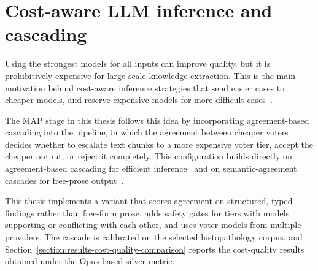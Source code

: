 \section{Cost-aware LLM inference and cascading}\label{section:background-cost-aware-llm-inference-and-cascading}

Using the strongest models for all inputs can improve quality, but it is prohibitively expensive for large-scale knowledge extraction. This is the main motivation behind cost-aware inference strategies that send easier cases to cheaper models, and reserve expensive models for more difficult cases~\parencite{chen2023frugalgpt}. 

The MAP stage in this thesis follows this idea by incorporating agreement-based cascading into the pipeline, in which the agreement between cheaper voters decides whether to escalate text chunks to a more expensive voter tier, accept the cheaper output, or reject it completely. This configuration builds directly on agreement-based cascading for efficient inference~\parencite{kolawole2025abc} and on semantic-agreement cascades for free-prose output~\parencite{soiffer2025semantic}.

This thesis implements a variant that scores agreement on structured, typed findings rather than free-form prose, adds 
safety gates for tiers with models supporting or conflicting with each other, and uses voter models from multiple providers. The cascade is calibrated on the selected histopathology corpus, and Section~\ref{section:results-cost-quality-comparison} reports the cost-quality results obtained under the Opus-based silver metric.